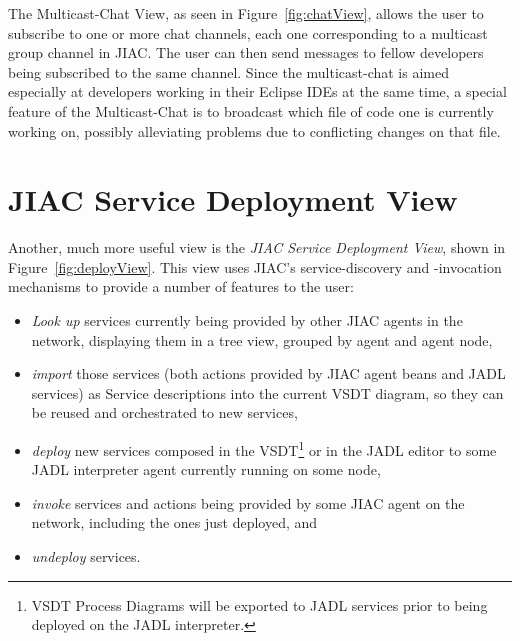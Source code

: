 The Multicast-Chat View, as seen in Figure~\ref{fig:chatView}, allows the user to
subscribe to one or more chat channels, each one corresponding to a multicast
group channel in JIAC.  The user can then send messages to fellow developers being
subscribed to the same channel.  Since the multicast-chat is aimed especially at
developers working in their Eclipse IDEs at the same time, a special feature of
the Multicast-Chat is to broadcast which file of code one is currently working
on, possibly alleviating problems due to conflicting changes on that file.



\section{JIAC Service Deployment View}

Another, much more useful view is the \emph{JIAC Service Deployment View}, shown
in Figure~\ref{fig:deployView}.  This view uses JIAC's service-discovery and
-invocation mechanisms to provide a number of features to the user:

\begin{itemize}
	\item \emph{Look up} services currently being provided by other JIAC agents in
	the network, displaying them in a tree view, grouped by agent and agent node,

	\item \emph{import} those services (both actions provided by JIAC agent beans
	and JADL services) as Service descriptions into the current VSDT diagram, so
	they can be reused and orchestrated to new services,
	
	\item \emph{deploy} new services composed in the VSDT\footnote{VSDT Process
	Diagrams will be exported to JADL services prior to being deployed on the
	JADL interpreter.} or in the JADL editor to some JADL interpreter agent
	currently running on some node,

	\item \emph{invoke} services and actions being provided by some JIAC agent on
	the network, including the ones just deployed, and
	
	\item \emph{undeploy} services.
\end{itemize}

